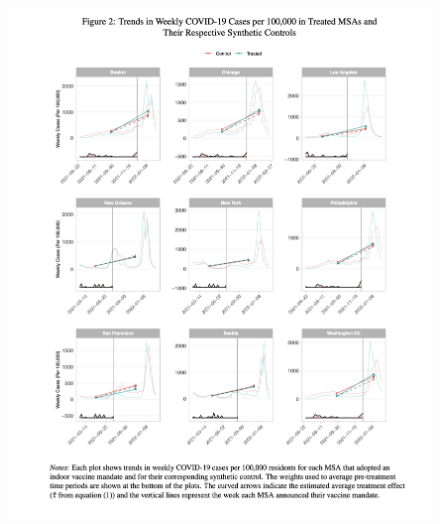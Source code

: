 \documentclass{beamer}
\begin{document}
\begin{frame}[plain]

	\begin{figure}
	\includegraphics[scale=0.3]{./lecture_includes/vitor_figure2}
	\end{figure}

\end{frame}
\end{document}
